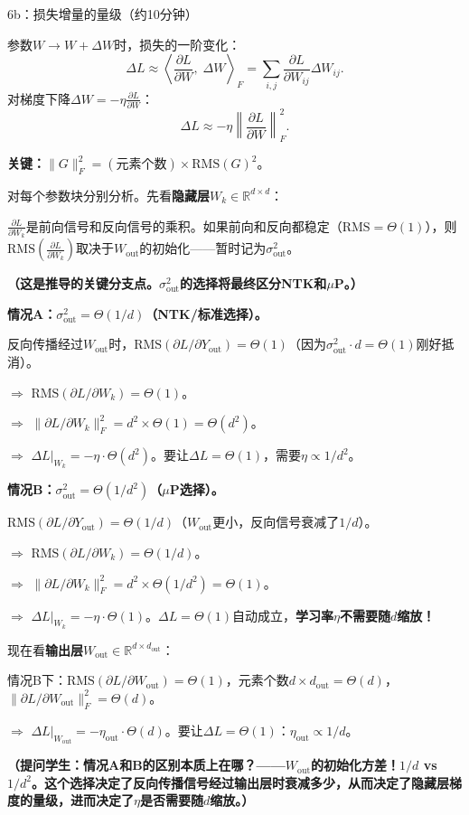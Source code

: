 \documentclass[11pt,a4paper]{article}
\newcommand{\R}{\mathbb{R}}
\begin{document}
\begin{handcalc}{6b：损失增量的量级（约10分钟）}

参数$W\to W+\Delta W$时，损失的一阶变化：
\[
\Delta L \approx \left\langle\frac{\partial L}{\partial W},\;\Delta W\right\rangle_F = \sum_{i,j}\frac{\partial L}{\partial W_{ij}}\Delta W_{ij}.
\]
对梯度下降$\Delta W = -\eta\frac{\partial L}{\partial W}$：
\[
\Delta L \approx -\eta\left\|\frac{\partial L}{\partial W}\right\|_F^2.
\]

\tcblower

\textbf{关键：}$\|G\|_F^2 = (\text{元素个数})\times\text{RMS}(G)^2$。

对每个参数块分别分析。先看\textbf{隐藏层}$W_k\in\R^{d\times d}$：

$\frac{\partial L}{\partial W_k}$是前向信号和反向信号的乘积。如果前向和反向都稳定（$\text{RMS}=\Theta(1)$），则$\text{RMS}\!\left(\frac{\partial L}{\partial W_k}\right)$取决于$W_{\text{out}}$的初始化——暂时记为$\sigma_{\text{out}}^2$。

\textbf{（这是推导的关键分支点。$\sigma_{\text{out}}^2$的选择将最终区分NTK和$\mu$P。）}

\textbf{情况A：$\sigma_{\text{out}}^2=\Theta(1/d)$（NTK/标准选择）。}

反向传播经过$W_{\text{out}}$时，$\text{RMS}(\partial L/\partial Y_{\text{out}})=\Theta(1)$（因为$\sigma_{\text{out}}^2\cdot d = \Theta(1)$刚好抵消）。

$\Rightarrow$ $\text{RMS}(\partial L/\partial W_k) = \Theta(1)$。

$\Rightarrow$ $\|\partial L/\partial W_k\|_F^2 = d^2\times\Theta(1) = \Theta(d^2)$。

$\Rightarrow$ $\Delta L|_{W_k} = -\eta\cdot\Theta(d^2)$。要让$\Delta L=\Theta(1)$，需要$\eta\propto 1/d^2$。

\textbf{情况B：$\sigma_{\text{out}}^2=\Theta(1/d^2)$（$\mu$P选择）。}

$\text{RMS}(\partial L/\partial Y_{\text{out}}) = \Theta(1/d)$（$W_{\text{out}}$更小，反向信号衰减了$1/d$）。

$\Rightarrow$ $\text{RMS}(\partial L/\partial W_k) = \Theta(1/d)$。

$\Rightarrow$ $\|\partial L/\partial W_k\|_F^2 = d^2\times\Theta(1/d^2) = \Theta(1)$。

$\Rightarrow$ $\Delta L|_{W_k} = -\eta\cdot\Theta(1)$。$\Delta L=\Theta(1)$自动成立，\textbf{学习率$\eta$不需要随$d$缩放！}

\medskip
现在看\textbf{输出层}$W_{\text{out}}\in\R^{d\times d_{\text{out}}}$：

情况B下：$\text{RMS}(\partial L/\partial W_{\text{out}})=\Theta(1)$，元素个数$d\times d_{\text{out}}=\Theta(d)$，$\|\partial L/\partial W_{\text{out}}\|_F^2=\Theta(d)$。

$\Rightarrow$ $\Delta L|_{W_{\text{out}}} = -\eta_{\text{out}}\cdot\Theta(d)$。要让$\Delta L=\Theta(1)$：$\eta_{\text{out}}\propto 1/d$。

\medskip
\textbf{（提问学生：情况A和B的区别本质上在哪？——$W_{\text{out}}$的初始化方差！$1/d$ vs $1/d^2$。这个选择决定了反向传播信号经过输出层时衰减多少，从而决定了隐藏层梯度的量级，进而决定了$\eta$是否需要随$d$缩放。）}
\end{handcalc}
\end{document}
